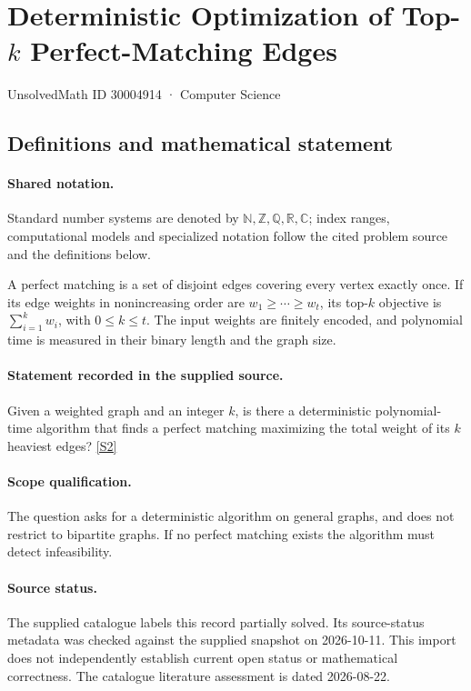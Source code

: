 \documentclass[11pt]{article}
\newcommand{\sref}[2]{\hyperlink{source:#1:#2}{[S#2]}}
\begin{document}
\setcounter{section}{30004913}
\section{Deterministic Optimization of Top-$k$ Perfect-Matching Edges}\label{30004914}
{\small\sffamily UnsolvedMath ID 30004914 · Computer Science}
\subsection{Definitions and mathematical statement}

\paragraph{Shared notation.}Standard number systems are denoted by $\mathbb N,\mathbb Z,\mathbb Q,\mathbb R,\mathbb C$; index ranges, computational models and specialized notation follow the cited problem source and the definitions below.


A perfect matching is a set of disjoint edges covering every vertex exactly once. If its edge weights in nonincreasing order are $w_1\geq\cdots\geq w_t$, its top-$k$ objective is $\sum_{i=1}^kw_i$, with $0\leq k\leq t$. The input weights are finitely encoded, and polynomial time is measured in their binary length and the graph size.
\paragraph{Statement recorded in the supplied source.}
Given a weighted graph and an integer $k$, is there a deterministic polynomial-time algorithm that finds a perfect matching maximizing the total weight of its $k$ heaviest edges? \sref{30004914}{2}
\paragraph{Scope qualification.}
The question asks for a deterministic algorithm on general graphs, and does not restrict to bipartite graphs. If no perfect matching exists the algorithm must detect infeasibility.
\paragraph{Source status.}
The supplied catalogue labels this record partially solved. Its source-status metadata was checked against the supplied snapshot on 2026-10-11. This import does not independently establish current open status or mathematical correctness. The catalogue literature assessment is dated 2026-08-22.
\end{document}
